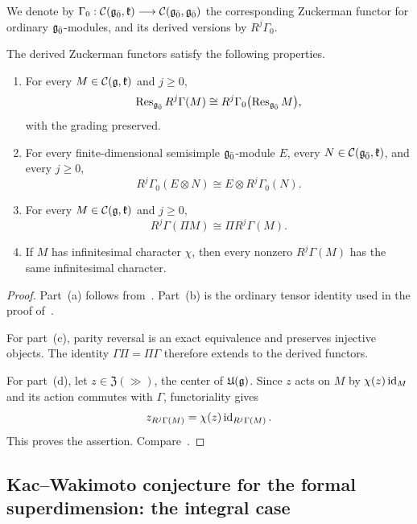 We denote by
$
\Gamma_0:
{\mathcal C}({\mathfrak{g}_{\bar{0}}},{\mathfrak k})
\longrightarrow
{\mathcal C}({\mathfrak{g}_{\bar{0}}},{\mathfrak{g}_{\bar{0}}})
$
the corresponding Zuckerman functor for ordinary ${\mathfrak{g}_{\bar{0}}}$-modules, and its derived versions by $R^{j}\Gamma_{0}$. 
\begin{proposition}
\label{prop::Zuckerman_compatibilities}
The derived Zuckerman functors satisfy the following properties.
\begin{enumerate}
\item[(a)] For every $M\in{\mathcal C}({\mathfrak{g}},{\mathfrak k})$ and $j\geq0$,
\[
\operatorname{Res}_{{\mathfrak{g}_{\bar{0}}}}R^j\Gamma(M)
\cong
R^j\Gamma_0\bigl(\operatorname{Res}_{{\mathfrak{g}_{\bar{0}}}}M\bigr),
\]
with the grading preserved.

\item[(b)] For every finite-dimensional semisimple ${\mathfrak{g}_{\bar{0}}}$-module $E$, every $N\in{\mathcal C}({\mathfrak{g}_{\bar{0}}},{\mathfrak k})$, and every $j\geq0$,
\[
R^j\Gamma_0(E\otimes N)
\cong
E\otimes R^j\Gamma_0(N).
\]

\item[(c)] For every $M\in{\mathcal C}({\mathfrak{g}},{\mathfrak k})$ and $j\geq0$,
\[
R^j\Gamma(\Pi M)
\cong
\Pi R^j\Gamma(M).
\]

\item[(d)] If $M$ has infinitesimal character $\chi$, then every nonzero $R^j\Gamma(M)$ has the same infinitesimal character.
\end{enumerate}
\end{proposition}

\begin{proof}
Part~(a) follows from~\cite[Lemma~4.10]{coulembier2016bott}. Part~(b) is the ordinary tensor identity used in the proof of~\cite[Lemma~4.12]{coulembier2016bott}.

For part~(c), parity reversal is an exact equivalence and preserves injective objects. The identity $\Gamma\Pi=\Pi\Gamma$ therefore extends to the derived functors.

For part~(d), let $z\in\mathfrak Z(\gg)$, the center of ${\mathfrak U}({\mathfrak{g}})$. Since $z$ acts on $M$ by $\chi(z)\operatorname{id}_M$ and its action commutes with $\Gamma$, functoriality gives
\[
z_{R^j\Gamma(M)}
=
\chi(z)\operatorname{id}_{R^j\Gamma(M)}.
\]
This proves the assertion. Compare~\cite[Proposition~6.2.1]{huang2007dirac}.
\end{proof}


\subsection{Kac--Wakimoto conjecture for the formal superdimension: the integral case}\label{subsec::KW_conjecture_integral_case}


